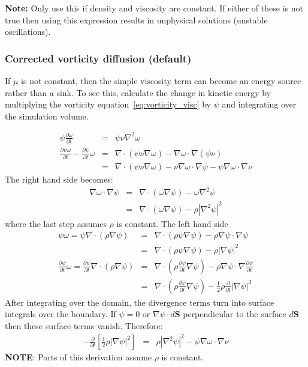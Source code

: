 \documentclass[12pt,a4paper]{article}
\newcommand{\lr}[1]{\left( #1 \right)}
\begin{document}
{\bf Note:} Only use this if density and viscosity are constant.
If either of these is not true then using this expression results in
unphysical solutions (unstable oscillations).

\subsubsection{Corrected vorticity diffusion (default)}

If $\mu$ is not constant, then the simple viscosity term can become an
energy source rather than a sink. To see this, calculate the change
in kinetic energy by multiplying the vorticity equation~\ref{eq:vorticity_visc}
by $\psi$ and integrating over the simulation volume.

\begin{eqnarray}
  \psi \frac{\partial\omega}{\partial t} &=& \psi\nu\nabla^2\omega \\
  \frac{\partial\psi\omega}{\partial t} - \frac{\partial\psi}{\partial t}\omega &=& \nabla\cdot\left(\psi\nu\nabla\omega\right) - \nabla\omega\cdot\nabla\left(\psi\nu\right) \\
  &=&  \nabla\cdot\left(\psi\nu\nabla\omega\right) -\nu \nabla\omega\cdot\nabla\psi - \psi\nabla\omega\cdot\nabla\nu 
\end{eqnarray}
The right hand side becomes:
\begin{eqnarray}
  \nabla\omega\cdot\nabla\psi &=& \nabla\cdot\lr{\omega\nabla\psi} - \omega\nabla^2\psi \\
  &=& \nabla\cdot\lr{\omega\nabla\psi} - \rho\left|\nabla^2\psi\right|^2
\end{eqnarray}
where the last step assumes $\rho$ is constant. The left hand side
\begin{eqnarray}
  \psi\omega = \psi\nabla\cdot\lr{\rho\nabla\psi} &=& \nabla\cdot\lr{\rho\psi\nabla\psi} -\rho\nabla\psi\cdot\nabla\psi  \\
  &=& \nabla\cdot\lr{\rho\psi\nabla\psi} -\rho\left|\nabla\psi\right|^2 \\
  \frac{\partial\psi}{\partial t}\omega = \frac{\partial\psi}{\partial t}\nabla\cdot\lr{\rho\nabla\psi} &=& \nabla\cdot\lr{\rho\frac{\partial\psi}{\partial t}\nabla\psi} - \rho\nabla\psi\cdot\nabla\frac{\partial\psi}{\partial t} \\
  &=& \nabla\cdot\lr{\rho\frac{\partial\psi}{\partial t}\nabla\psi} - \frac{1}{2}\rho\frac{\partial}{\partial t}\left|\nabla\psi\right|^2
\end{eqnarray}
After integrating over the domain, the divergence terms turn into surface integrals over the boundary. If $\psi = 0$ or $\nabla\psi\cdot d\mathbf{S}$ perpendicular to the surface $d\mathbf{S}$ then these surface terms vanish. Therefore:
\begin{eqnarray}
 -\frac{\partial}{\partial t}\left[\frac{1}{2}\rho\left|\nabla\psi\right|^2\right] &=& \rho\left|\nabla^2\psi\right|^2 - \psi\nabla\omega\cdot\nabla\nu
\end{eqnarray}
{\bf NOTE}: Parts of this derivation assume $\rho$ is constant.
    
\end{document}
